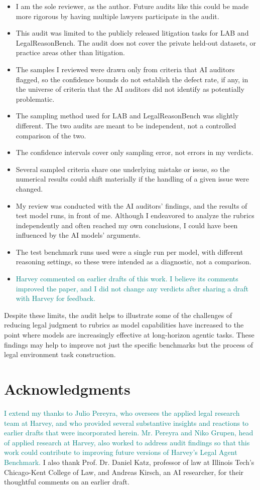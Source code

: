 \documentclass[11pt]{article}
\newcommand{\pending}[1]{\textcolor{teal}{#1}}
\begin{document}
\begin{itemize}
\item I am the sole reviewer, as the author. Future audits like this could be made more rigorous by having multiple lawyers participate in the audit.
\item This audit was limited to the publicly released litigation tasks for LAB and LegalReasonBench. The audit does not cover the private held-out datasets, or practice areas other than litigation.
\item The samples I reviewed were drawn only from criteria that AI auditors flagged, so the confidence bounds do not establish the defect rate, if any, in the universe of criteria that the AI auditors did not identify as potentially problematic.
\item The sampling method used for LAB and LegalReasonBench was slightly different. The two audits are meant to be independent, not a controlled comparison of the two.
\item The confidence intervals cover only sampling error, not errors in my verdicts.
\item Several sampled criteria share one underlying mistake or issue, so the numerical results could shift materially if the handling of a given issue were changed.
\item My review was conducted with the AI auditors' findings, and the results of test model runs, in front of me. Although I endeavored to analyze the rubrics independently and often reached my own conclusions, I could have been influenced by the AI models' arguments.
\item The test benchmark runs used were a single run per model, with different reasoning settings, so these were intended as a diagnostic, not a comparison. 
\item \pending{Harvey commented on earlier drafts of this work. I believe its comments improved the paper, and I did not change any verdicts after sharing a draft with Harvey for feedback.}
\end{itemize}

Despite these limits, the audit helps to illustrate some of the challenges of reducing legal judgment to rubrics as model capabilities have increased to the point where models are increasingly effective at long-horizon agentic tasks. These findings may help to improve not just the specific benchmarks but the process of legal environment task construction.

\section*{Acknowledgments}
\pending{I extend my thanks to Julio Pereyra, who oversees the applied legal research team at Harvey, and who provided several substantive insights and reactions to earlier drafts that were incorporated herein. Mr. Pereyra and Niko Grupen, head of applied research at Harvey, also worked to address audit findings so that this work could contribute to improving future versions of Harvey's Legal Agent Benchmark.} I also thank Prof. Dr. Daniel Katz, professor of law at Illinois Tech’s Chicago-Kent College of Law, and Andreas Kirsch, an AI researcher, for their thoughtful comments on an earlier draft.
\end{document}
